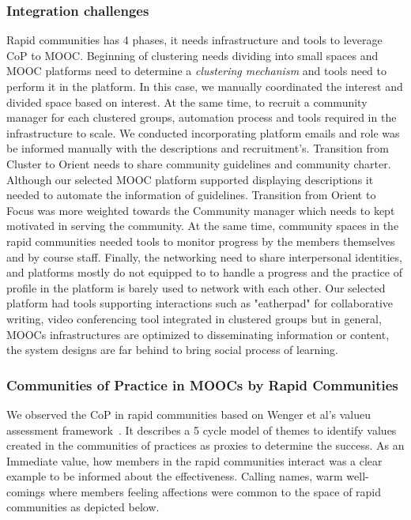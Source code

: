 \documentclass[manuscript,screen,review]{acmart}
\begin{document}
\subsubsection{Integration challenges}
Rapid communities has 4 phases, it needs infrastructure and tools to leverage CoP to MOOC. Beginning of clustering needs dividing into small spaces  and MOOC platforms need to determine a \textit{clustering mechanism} and tools need to perform it in the platform. In this case, we manually coordinated the interest and divided space based on interest. At the same time, to recruit a community manager for each clustered groups, automation process and tools required in the infrastructure to scale. We conducted incorporating platform emails and role was be informed manually with the descriptions and recruitment's. Transition from Cluster to Orient needs to share community guidelines and community charter.  Although our selected MOOC platform supported displaying descriptions it needed to automate the information of guidelines. Transition from Orient to Focus was more weighted towards the Community manager which needs to kept motivated in serving the community. At the same time, community spaces in the rapid communities needed tools to monitor progress by the members themselves and by course staff.  Finally, the networking need to share interpersonal identities, and platforms mostly do not equipped to to handle a progress and the practice of profile in the platform is barely used to network with each other. Our selected platform  had tools supporting interactions such as "eatherpad" for collaborative writing, video conferencing tool integrated in clustered groups but in general, MOOCs infrastructures are optimized to disseminating information or content, the system designs are far behind to bring social process of learning. 


\subsubsection{Communities of Practice in MOOCs by Rapid Communities}
We observed the CoP in rapid communities based on Wenger et al's valueu assessment framework~\cite{wenger2011promoting}. It describes a 5 cycle model of themes to identify values created in the communities of practices as proxies to determine the success. As an Immediate value, how members in the rapid communities interact was a clear example to be informed about the effectiveness. Calling names, warm well-comings where members feeling affections were common to the space of rapid communities as depicted below. 
\end{document}
